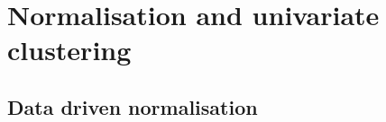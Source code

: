 \chapter{ \label{appendix:normalisation} Normalisation and univariate clustering}







\section{Data driven normalisation}


